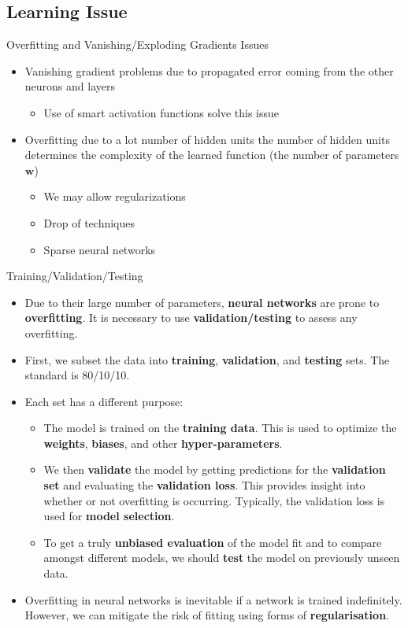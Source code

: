 \documentclass[10pt, hyperref={colorlinks = true,linkcolor = blue}]{beamer}
\begin{document}
{{{\subsection{Learning Issue}

\begin{frame} {Overfitting and Vanishing/Exploding Gradients  Issues}
\begin{itemize}
\item  Vanishing gradient problems due to propagated error coming from the other neurons and layers
\begin{itemize}
\item Use of smart activation functions solve this issue 
\end{itemize}
\item Overfitting due to a lot number of hidden units the number of hidden units determines the complexity of the learned function (the number of parameters $\bm w$)
\begin{itemize}
\item We may allow regularizations 
\item Drop of techniques 
\item Sparse neural networks 
\end{itemize} 
\end{itemize}
\end{frame}


\begin{frame}{Training/Validation/Testing}
 \begin{itemize}[<+->]
    \item Due to their large number of parameters, \textbf{neural networks} are prone to \textbf{overfitting}. It is necessary to use \textbf{validation/testing} to assess any overfitting.
    \item First, we subset the data into \textbf{training}, \textbf{validation}, and \textbf{testing} sets. The standard is 80/10/10.
    \item Each set has a different purpose:
    \begin{itemize}
        \item The model is trained on the \textbf{training data}. This is used to optimize the \textbf{weights}, \textbf{biases}, and other \textbf{hyper-parameters}.
        \item We then \textbf{validate} the model by getting predictions for the \textbf{validation set} and evaluating the \textbf{validation loss}. This provides insight into whether or not overfitting is occurring. Typically, the validation loss is used for \textbf{model selection}.
        \item To get a truly \textbf{unbiased evaluation} of the model fit and to compare amongst different models, we should \textbf{test} the model on previously unseen data.
    \end{itemize}
\item Overfitting in neural networks is inevitable if a network is trained
indefinitely. However, we can mitigate the risk of fitting using forms of \textbf{regularisation}. 
\end{itemize}
\end{frame}


}}}
\end{document}
